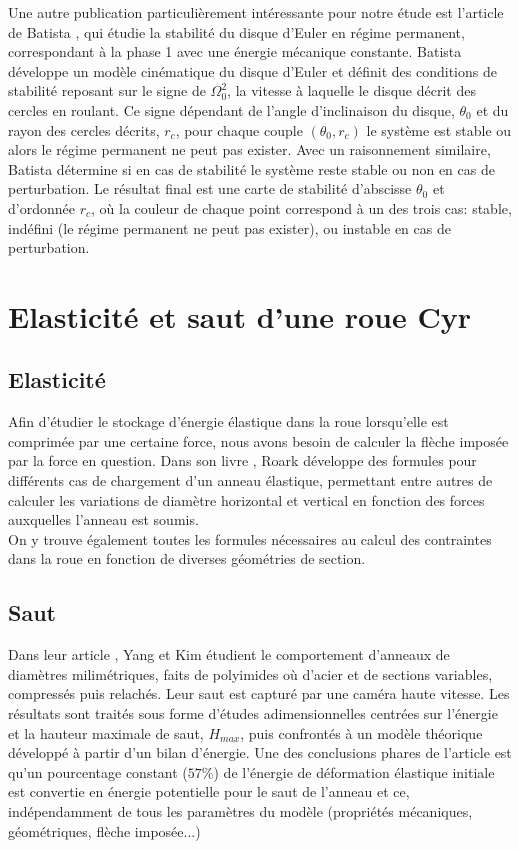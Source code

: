 Une autre publication particulièrement intéressante pour notre étude est l'article de Batista \cite{Batista}, qui étudie la stabilité du disque d'Euler en régime permanent, correspondant à la phase 1 avec une énergie mécanique constante. Batista développe un modèle cinématique du disque d'Euler et définit des conditions de stabilité reposant sur le signe de $\Omega_0^2$, la vitesse à laquelle le disque décrit des cercles en roulant. Ce signe dépendant de l'angle d'inclinaison du disque, $\theta_0$ et du rayon des cercles décrits, $r_c$, pour chaque couple $(\theta_0,r_c)$ le système est stable ou alors le régime permanent ne peut pas exister. Avec un raisonnement similaire, Batista détermine si en cas de stabilité le système reste stable ou non en cas de perturbation. Le résultat final est une carte de stabilité d'abscisse $\theta_0$ et d'ordonnée $r_c$, où la couleur de chaque point correspond à un des trois cas: stable, indéfini (le régime permanent ne peut pas exister), ou instable en cas de perturbation.

\section{Elasticité et saut d'une roue Cyr}
\subsection{Elasticité}
Afin d’étudier le stockage d’énergie élastique dans la roue lorsqu’elle est comprimée par une certaine force, nous avons besoin de calculer la flèche imposée par la force en question. Dans son livre \cite{roark}, Roark développe des formules pour différents cas de chargement d’un anneau élastique, permettant entre autres de calculer les variations de diamètre horizontal et vertical en fonction des forces auxquelles l’anneau est soumis. \\
On y trouve également toutes les formules nécessaires au calcul des contraintes dans la roue en fonction de diverses géométries de section.

\subsection{Saut}
Dans leur article \cite{yangkim}, Yang et Kim étudient le comportement d'anneaux de diamètres milimétriques, faits de polyimides où d'acier et de sections variables, compressés puis relachés. Leur saut est capturé par une caméra haute vitesse. Les résultats sont traités sous forme d'études adimensionnelles centrées sur l'énergie et la hauteur maximale de saut, $H_{max}$, puis confrontés à un modèle théorique développé à partir d'un bilan d'énergie. Une des conclusions phares de l'article est qu'un pourcentage constant ($57\%$) de l'énergie de déformation élastique initiale est convertie en énergie potentielle pour le saut de l'anneau et ce, indépendamment de tous les paramètres du modèle (propriétés mécaniques, géométriques, flèche imposée...)